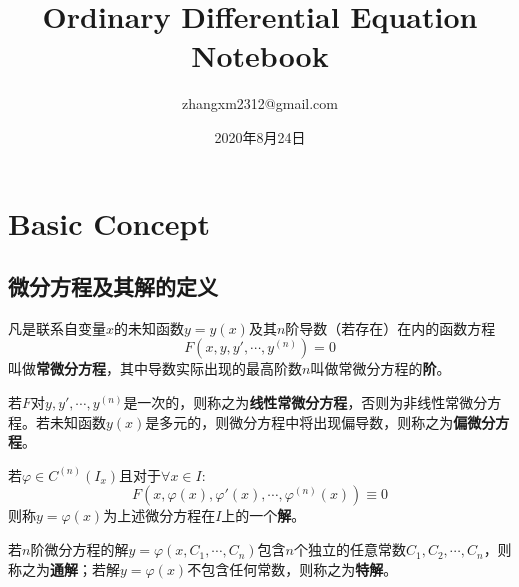 \documentclass[UTF8]{book}
\title{Ordinary Differential Equation Notebook}
\date{2020年8月24日}
\author{zhangxm2312@gmail.com}
\begin{document}
    \maketitle
    \tableofcontents

    \chapter{Basic Concept}
    \section{微分方程及其解的定义}
    凡是联系自变量$ x $的未知函数$ y=y(x) $及其$ n $阶导数（若存在）在内的函数方程$$ F(x,y,y',\cdots,y^{(n)})=0 $$叫做\textbf{常微分方程}，其中导数实际出现的最高阶数$ n $叫做常微分方程的\textbf{阶}。

    若$ F $对$ y,y',\cdots,y^{(n)} $是一次的，则称之为\textbf{线性常微分方程}，否则为非线性常微分方程。若未知函数$ y(x) $是多元的，则微分方程中将出现偏导数，则称之为\textbf{偏微分方程}。

    若$ \varphi\in C^{(n)}(I_x) $且对于$ \forall x\in I: $$$ F(x,\varphi(x),\varphi'(x),\cdots,\varphi^{(n)}(x))\equiv 0 $$则称$ y=\varphi(x) $为上述微分方程在$ I $上的一个\textbf{解}。

    若$ n $阶微分方程的解$ y=\varphi(x,C_1,\cdots,C_n) $包含$ n $个独立的任意常数$ C_1,C_2,\cdots,C_n $，则称之为\textbf{通解}；若解$ y=\varphi(x) $不包含任何常数，则称之为\textbf{特解}。
\end{document}
